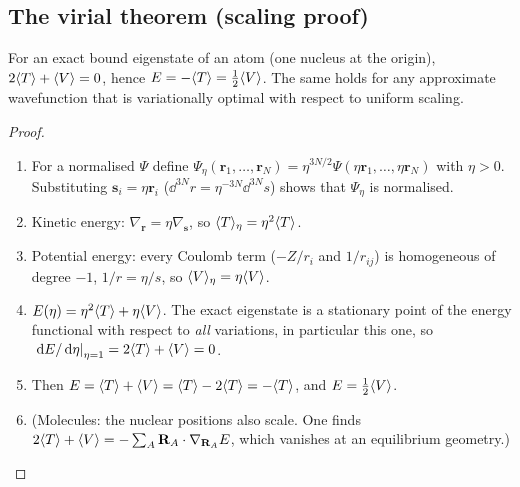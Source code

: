 \subsection{The virial theorem (scaling proof)}
\begin{proposition}\label{prop:virial}
For an exact bound eigenstate of an atom (one nucleus at the origin), $2\langle T\rangle+\langle V\rangle=0$, hence
$E=-\langle T\rangle=\tfrac12\langle V\rangle$. The same holds for any approximate wavefunction that is variationally optimal
with respect to uniform scaling.
\end{proposition}
\begin{proof}
\begin{enumerate}
  \item For a normalised $\Psi$ define $\Psi_\eta(\mathbf r_1,\dots,\mathbf r_N)=\eta^{3N/2}\Psi(\eta\mathbf r_1,\dots,\eta\mathbf r_N)$
        with $\eta>0$. Substituting $\mathbf s_i=\eta\mathbf r_i$ ($\dd^{3N}r=\eta^{-3N}\dd^{3N}s$) shows that
        $\Psi_\eta$ is normalised.
  \item Kinetic energy: $\nabla_{\mathbf r}=\eta\nabla_{\mathbf s}$, so $\langle T\rangle_\eta=\eta^2\langle T\rangle$.
  \item Potential energy: every Coulomb term ($-Z/r_i$ and $1/r_{ij}$) is homogeneous of degree $-1$,
        $1/r=\eta/s$, so $\langle V\rangle_\eta=\eta\langle V\rangle$.
  \item $E(\eta)=\eta^2\langle T\rangle+\eta\langle V\rangle$. The exact eigenstate is a stationary point of the energy
        functional with respect to \emph{all} variations, in particular this one, so
        $\left.\,\mathrm d E/\,\mathrm d\eta\right|_{\eta=1}=2\langle T\rangle+\langle V\rangle=0$.
  \item Then $E=\langle T\rangle+\langle V\rangle=\langle T\rangle-2\langle T\rangle=-\langle T\rangle$, and $E=\tfrac12\langle V\rangle$.
  \item (Molecules: the nuclear positions also scale. One finds $2\langle T\rangle+\langle V\rangle=-\sum_A\mathbf R_A\cdot\nabla_{\mathbf R_A}E$,
        which vanishes at an equilibrium geometry.)\qedhere
\end{enumerate}
\end{proof}

